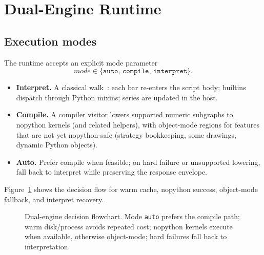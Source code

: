 \documentclass[11pt,a4paper]{article}
\begin{document}
\section{Dual-Engine Runtime}
\label{sec:runtime}

\subsection{Execution modes}
\label{sec:modes}

The runtime accepts an explicit mode parameter
\begin{equation}
  \textit{mode} \in \{\texttt{auto},\, \texttt{compile},\, \texttt{interpret}\}.
  \label{eq:modes}
\end{equation}

\begin{itemize}[leftmargin=1.2em]
  \item \textbf{Interpret.}
    A classical \ast{} walk~\citep{nystrom2021crafting}: each bar re-enters
    the script body; builtins dispatch through Python mixins; series are
    updated in the host.
  \item \textbf{Compile.}
    A compiler visitor lowers supported numeric subgraphs to
    \numba{}~\citep{lam2015numba,lattner2004llvm} nopython kernels (and
    related helpers), with object-mode regions for features that are not yet
    nopython-safe (strategy bookkeeping, some drawings, dynamic Python
    objects).
  \item \textbf{Auto.}
    Prefer compile when feasible; on hard failure or unsupported lowering,
    fall back to interpret while preserving the response envelope.
\end{itemize}

Figure~\ref{fig:dual} shows the decision flow for warm cache, nopython
success, object-mode fallback, and interpret recovery.

\begin{figure}[t]
  \centering
  \resizebox{0.98\textwidth}{!}{}
  \caption{Dual-engine decision flowchart.
  Mode \texttt{auto} prefers the compile path; warm disk/process \ir{} avoids
  repeated \jit{} cost; nopython kernels execute when available, otherwise
  object-mode; hard failures fall back to interpretation.}
  \label{fig:dual}
\end{figure}
\end{document}
